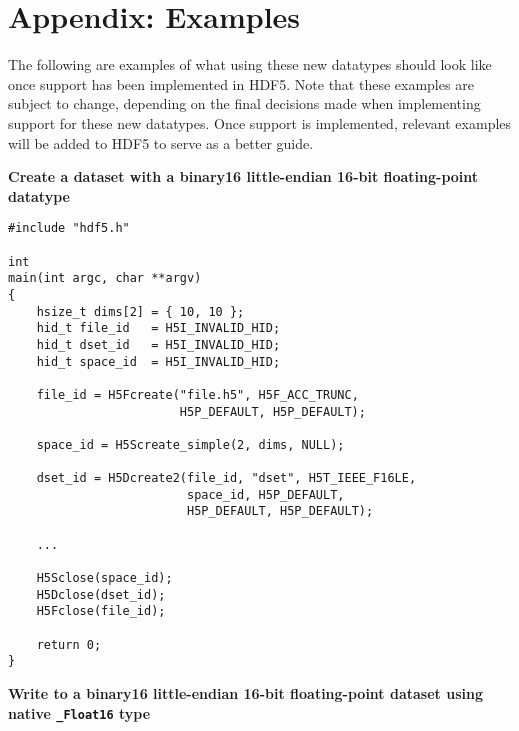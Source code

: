 \documentclass[../HDF5_RFC.tex]{subfiles}
\begin{document}
\newpage

\section{Appendix: Examples}
\label{apdx:examples}

The following are examples of what using these new datatypes should look like once
support has been implemented in HDF5. Note that these examples are subject to change,
depending on the final decisions made when implementing support for these new datatypes.
Once support is implemented, relevant examples will be added to HDF5 to serve as a
better guide.

\textbf{Create a dataset with a binary16 little-endian 16-bit floating-point datatype}

\begin{verbatim}
#include "hdf5.h"

int
main(int argc, char **argv)
{
    hsize_t dims[2] = { 10, 10 };
    hid_t file_id   = H5I_INVALID_HID;
    hid_t dset_id   = H5I_INVALID_HID;
    hid_t space_id  = H5I_INVALID_HID;

    file_id = H5Fcreate("file.h5", H5F_ACC_TRUNC,
                        H5P_DEFAULT, H5P_DEFAULT);

    space_id = H5Screate_simple(2, dims, NULL);

    dset_id = H5Dcreate2(file_id, "dset", H5T_IEEE_F16LE,
                         space_id, H5P_DEFAULT,
                         H5P_DEFAULT, H5P_DEFAULT);

    ...

    H5Sclose(space_id);
    H5Dclose(dset_id);
    H5Fclose(file_id);

    return 0;
}
\end{verbatim}

\newpage

\textbf{Write to a binary16 little-endian 16-bit floating-point dataset using native \texttt{\_Float16} type}
\end{document}
